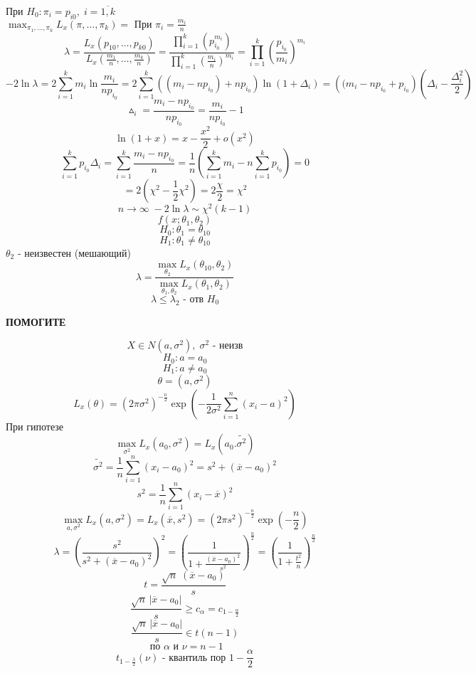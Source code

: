 \documentclass[a4paper]{article}
\begin{document}
При $ H_0: \pi_{i}= p_{i 0}, \; i = \overline{1,k} $ \\
$ \max_{\pi_1, \dots, \pi_{k}} L_{x}(\pi, \dots, \pi_{k}) = \text{ При } \pi_{i} =
\frac{m_{i}}{n} $ 
\[
    \lambda = \frac{L_x(p_{10} , \dots, p_{k 0})}{L_x(\frac{m_1}{n} , \dots,
    \frac{m_{k}}{n}) } = \frac{\prod_{i=1}^{k} (p_{i_0}^{m_{i}})}
    {\prod_{i=1}^{k} (\frac{m_{i}}{n})^{m_{i}}} = \prod_{i=1}^{k} (\frac{p_{i_0}}{m_{i}})
    ^{m_{i}}
\]
\[
    - 2 \ln \lambda = 2 \sum_{i=1}^{k} m_{i} \ln \frac{m_{i}}{np_{i_0}} =
    2 \sum_{i=1}^{k} \left( ( m_{i}- np_{i_0})+ np_{i_0} \right) \ln(1 + \Delta_{i}) = 
    \left( (m_{i} - np_{i_0} + p_{i_0} \right) (\Delta_{i} - \frac{\Delta_{i}^2}{2}) 
\]
\[
    \vartriangle_{i} = \frac{m_{i}- np_{i_0}}{np_{i_0}} = \frac{m_{i}}{np_{i_0}} 
    - 1
\]
\[
    \ln(1+x) =  x - \frac{x^2}{2} + o(x^2)
\]
\[
    \sum_{i=1}^{k} p_{i_0} \Delta_{i} = \sum_{i=1}^{k} \frac{m_{i} - np_{i_0}}{n} =
    \frac{1}{n} \left( \sum_{i=1}^{k} m_{i} - n \sum_{i=1}^{k} p_{i_0} \right) = 0
\]
\[
    = 2 (\chi^2 - \frac{1}{2} \chi^2) = 2 \frac{\chi}{2}  = \chi^2
\]
\[
    n \to \infty \; - 2 \ln \lambda \sim \chi^2 (k -1)
\]
\[
    f(x; \theta_1, \theta_2)
\]
\[
    H_0: \theta_1 = \theta_{10}
\]
\[
    H_1: \theta_1 \neq \theta_{10}
\]
$ \theta_2 $ -  неизвестен (мешающий)
\[
    \lambda = \frac{\max_{\theta_2} L_{x}(\theta_{10}, \theta_{2})}{\max_{\theta_1,
    \theta_2} L_x(\theta_1, \theta_2)} 
\]
\[
    \lambda \leq \lambda_2 \text{ - отв } H_0
\]
\begin{center}
    \textbf{ПОМОГИТЕ}
\end{center}
\[
    X \in N(a, \sigma^2), \; \sigma^2 \text{ - неизв}
\]
\[
    H_0: a = a_0
\]
\[
    H_1: a \neq a_0
\]
\[
    \theta = (a, \sigma^2)
\]
\[
    L_x(\theta) = (2 \pi \sigma^2)^{-\frac{n}{2} } \exp\left(-\frac{1}{2\sigma^2} 
    \sum_{i=1}^{n} (x_i - a)^2 \right)
\]
При гипотезе
\[
    \max_{\sigma^2} L_x(a_0, \sigma^2) = L_x (a_0. \tilde{\sigma^2})
\]
\[
    \tilde{\sigma^2} = \frac{1}{n} \sum_{i=1}^{n} (x_i - a_0)^2 = s^2 + (\overline{x}
    - a_0)^2
\]
\[
    s^2 = \frac{1}{n} \sum_{i=1}^{n} (x_i - \overline{x})^2
\]
\[
    \max_{a, \sigma^2} L_x(a, \sigma^2) = L_x(\overline{x}, s^2) = (2 \pi s^2)^{
    -\frac{n}{2} } \exp(-\frac{n}{2} )
\]
\[
    \lambda = \left( \frac{s^2}{s^2 + (\overline{x} - a_0)^2} \right)^2 = 
    \left( \frac{1}{1 + \frac{(\overline{x} - a_0)^2}{s^2} } \right)^{\frac{n}{2}}
    = \left( \frac{1}{1 + \frac{t^2}{n}} \right)^{\frac{n}{2}} 
\]
\[
    t = \frac{\sqrt{n} \;(\overline{x} - a_0)}{s} 
\]
\[
    \frac{\sqrt{n} \,| \overline{x} - a_0 |}{s} \geq c_{\alpha} = c_{1 - \frac{\alpha}{2}}
\]
\[
    \frac{\sqrt{n} \,| \overline{x} - a_0 |}{s} \in t(n-1)
\]
\[
    \text{ по } \alpha \text{ и } \nu = n-1
\]
\[
    t_{1 - \frac{\lambda}{2} }(\nu) \text{ - квантиль пор } 1 - \frac{\alpha}{2} 
\]
\end{document}
